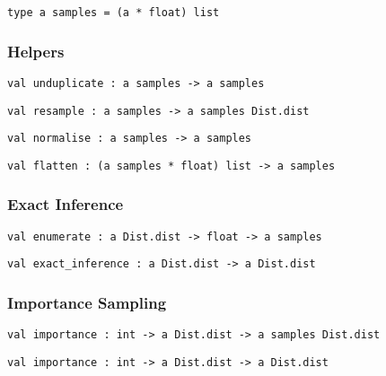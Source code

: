 \protect\hyperlink{type-samples}{}\texttt{type\ \textquotesingle{}a\ samples}\texttt{\ =\ (\textquotesingle{}a\ *\ float)\ list}

\hypertarget{infux5fhelpers}{\subsubsection{\texorpdfstring{\protect\hyperlink{infux5fhelpers}{}Helpers}{Helpers}}\label{infux5fhelpers}}

\protect\hyperlink{val-unduplicate}{}\texttt{val\ unduplicate\ :\ \textquotesingle{}a\ samples\ -\textgreater{}\ \textquotesingle{}a\ samples}

\protect\hyperlink{val-resample}{}\texttt{val\ resample\ :\ \textquotesingle{}a\ samples\ -\textgreater{}\ \textquotesingle{}a\ samples\ Dist.dist}

\protect\hyperlink{val-normalise}{}\texttt{val\ normalise\ :\ \textquotesingle{}a\ samples\ -\textgreater{}\ \textquotesingle{}a\ samples}

\protect\hyperlink{val-flatten}{}\texttt{val\ flatten\ :\ (\textquotesingle{}a\ samples\ *\ float)\ list\ -\textgreater{}\ \textquotesingle{}a\ samples}

\hypertarget{infux5fexact}{\subsubsection{\texorpdfstring{\protect\hyperlink{infux5fexact}{}Exact
Inference}{Exact Inference}}\label{infux5fexact}}

\protect\hyperlink{val-enumerate}{}\texttt{val\ enumerate\ :\ \textquotesingle{}a\ Dist.dist\ -\textgreater{}\ float\ -\textgreater{}\ \textquotesingle{}a\ samples}

\protect\hyperlink{val-exactux5finference}{}\texttt{val\ exact\_inference\ :\ \textquotesingle{}a\ Dist.dist\ -\textgreater{}\ \textquotesingle{}a\ Dist.dist}

\hypertarget{infux5fimp}{\subsubsection{\texorpdfstring{\protect\hyperlink{infux5fimp}{}Importance
Sampling}{Importance Sampling}}\label{infux5fimp}}

\protect\hyperlink{val-importance}{}\texttt{val\ importance\ :\ int\ -\textgreater{}\ \textquotesingle{}a\ Dist.dist\ -\textgreater{}\ \textquotesingle{}a\ samples\ Dist.dist}

\protect\hyperlink{val-importanceux27}{}\texttt{val\ importance\textquotesingle{}\ :\ int\ -\textgreater{}\ \textquotesingle{}a\ Dist.dist\ -\textgreater{}\ \textquotesingle{}a\ Dist.dist}

